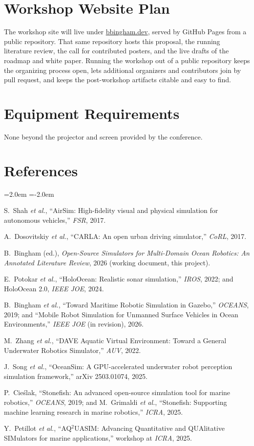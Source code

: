 \documentclass[10pt]{article}
\newcommand{\refitem}[2]{\item[{[#1]}] #2}
\begin{document}
\section{Workshop Website Plan}\label{sec:website}

The workshop site will live under \href{https://bbingham.dev}{bbingham.dev}, served by GitHub Pages from a public repository. That same repository hosts this proposal, the running literature review, the call for contributed posters, and the live drafts of the roadmap and white paper. Running the workshop out of a public repository keeps the organizing process open, lets additional organizers and contributors join by pull request, and keeps the post-workshop artifacts citable and easy to find.

\section{Equipment Requirements}

None beyond the projector and screen provided by the conference.

\vspace{2pt}
\section*{References}
\small
\begin{list}{}{\leftmargin=2.0em \itemsep=0pt \parsep=0pt \itemindent=-2.0em}
  \refitem{1}{S.~Shah \emph{et al.}, ``AirSim: High-fidelity visual and physical simulation for autonomous vehicles,'' \emph{FSR}, 2017.}
  \refitem{2}{A.~Dosovitskiy \emph{et al.}, ``CARLA: An open urban driving simulator,'' \emph{CoRL}, 2017.}
  \refitem{3}{B.~Bingham (ed.), \emph{Open-Source Simulators for Multi-Domain Ocean Robotics: An Annotated Literature Review}, 2026 (working document, this project).}
  \refitem{4}{E.~Potokar \emph{et al.}, ``HoloOcean: Realistic sonar simulation,'' \emph{IROS}, 2022; and HoloOcean 2.0, \emph{IEEE JOE}, 2024.}
  \refitem{5}{B.~Bingham \emph{et al.}, ``Toward Maritime Robotic Simulation in Gazebo,'' \emph{OCEANS}, 2019; and ``Mobile Robot Simulation for Unmanned Surface Vehicles in Ocean Environments,'' \emph{IEEE JOE} (in revision), 2026.}
  \refitem{6}{M.~Zhang \emph{et al.}, ``DAVE Aquatic Virtual Environment: Toward a General Underwater Robotics Simulator,'' \emph{AUV}, 2022.}
  \refitem{7}{J.~Song \emph{et al.}, ``OceanSim: A GPU-accelerated underwater robot perception simulation framework,'' arXiv 2503.01074, 2025.}
  \refitem{8}{P.~Cie\'slak, ``Stonefish: An advanced open-source simulation tool for marine robotics,'' \emph{OCEANS}, 2019; and M.~Grimaldi \emph{et al.}, ``Stonefish: Supporting machine learning research in marine robotics,'' \emph{ICRA}, 2025.}
  \refitem{9}{Y.~Petillot \emph{et al.}, ``AQ$^2$UASIM: Advancing Quantitative and QUAlitative SIMulators for marine applications,'' workshop at \emph{ICRA}, 2025.}
\end{list}
\end{document}

